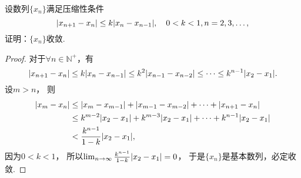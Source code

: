 \begin{example}
设数列\(\{x_n\}\)满足压缩性条件\[
	\abs{x_{n+1} - x_n}
	\leq k \abs{x_n - x_{n-1}},
	\quad 0<k<1, n=2,3,\dotsc,
\]
证明：\(\{x_n\}\)收敛.
\begin{proof}
对于\(\forall n\in\mathbb{N}^+\)，有\[
	\abs{x_{n+1} - x_n}
	\leq k \abs{x_n - x_{n-1}}
	\leq k^2 \abs{x_{n-1} - x_{n-2}}
	\leq \dotsb
	\leq k^{n-1} \abs{x_2 - x_1}.
\]
设\(m > n\)，
则\begin{align*}
	\abs{x_m - x_n}
	&\leq \abs{x_m - x_{m-1}}
	+ \abs{x_{m-1} - x_{m-2}}
	+ \dotsb + \abs{x_{n+1} - x_n} \\
	&\leq k^{m-2} \abs{x_2 - x_1}
	+ k^{m-3} \abs{x_2 - x_1}
	+ \dotsb + k^{n-1} \abs{x_2 - x_1} \\
	&< \frac{k^{n-1}}{1-k} \abs{x_2 - x_1},
\end{align*}
因为\(0<k<1\)，
所以\(\lim_{n\to\infty} \frac{k^{n-1}}{1-k} \abs{x_2 - x_1} = 0\)，
于是\(\{x_n\}\)是基本数列，必定收敛.
\end{proof}
\end{example}
